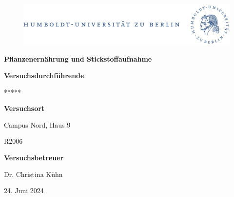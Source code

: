 \documentclass[10pt,a4paper]{article}
\begin{document}
	
	\begin{titlepage}
		\begin{center}
			\begin{figure}[h!tbp]
				\includegraphics[width=\linewidth]{HUlogo.PNG}
			\end{figure}
			\vspace*{2 cm}
			
			\textcolor{Bluetitle}{\textbf{\huge Pflanzenernährung und Stickstoffaufnahme}}\par
			
			\vspace*{2cm}
			
			\textcolor{Greyish}{\textbf{Versuchsdurchführende}}\par
			\textcolor{Greyish}{*****}\par
			
			\vspace*{0.5cm}
			\textcolor{Greyish}{\textbf{Versuchsort}}\par
			\textcolor{Greyish}{Campus Nord, Haus 9}\par
			\textcolor{Greyish}{R2006}\par
			\vspace*{0.5cm}
			\textcolor{Greyish}{\textbf{Versuchsbetreuer}}\par
			\textcolor{Greyish}{Dr. Christina Kühn}\par
			
			\vspace*{2 cm}
			
			\textcolor{Greyish}{24. Juni 2024}\par
			
			
			
			
		\end{center}
	\end{titlepage}
	
	\tableofcontents
	
\end{document}
